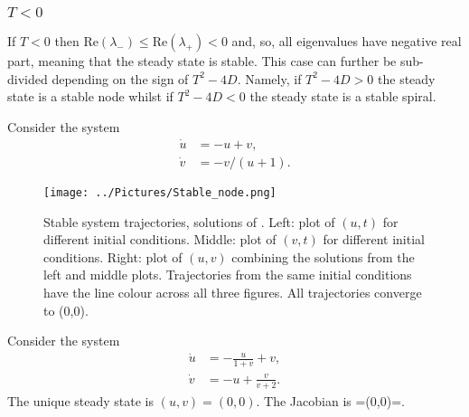 \subsubsection{$T<0$}
If $T<0$ then $\textrm{Re}(\lambda_-)\leq \textrm{Re}(\lambda_+)<0$ and, so, all eigenvalues have negative real part, meaning that the steady state is stable. This case can further be sub-divided depending on the sign of $T^2-4D$. Namely, if $T^2-4D>0$ the steady state is a stable node whilst if $T^2-4D<0$ the steady state is a stable spiral.
\begin{example}[frametitle=Stable node]
Consider the system
\begin{align}
\dot{u}&=-u+v,\label{Stable_1}\\
\dot{v}&=-v/(u+1)\label{Stable_2}.
\end{align}
\end{example}
\begin{figure}[!!!h!!!tb]
\centering
\texttt{[image: ../Pictures/Stable\_node.png]}
\caption{\label{Stable_node}Stable system trajectories, solutions of . Left: plot of $(u,t)$ for different initial conditions. Middle: plot of $(v,t)$ for different initial conditions. Right: plot of $(u,v)$ combining the solutions from the left and middle plots. Trajectories from the same initial conditions have the line colour across all three figures. All trajectories converge to (0,0).}
\end{figure}
\begin{example}[frametitle=Stable spiral]
Consider the system
\begin{align}
\dot{u}&=-\frac{u}{1+v}+v,\label{St_Spiral_1}\\
\dot{v}&=-u+\frac{v}{v+2}\label{St_Spiral_2}.
\end{align}
The unique steady state is $(u,v)=(0,0)$. The Jacobian is
\bb
{}= \implies {}(0,0)=.
\ee
{}
\end{example}
